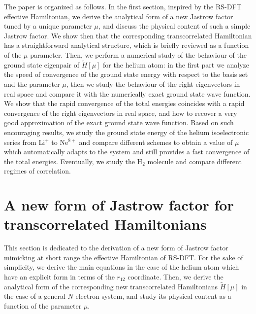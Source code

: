 \documentclass[aip,jcp,reprint,noshowkeys,superscriptaddress]{revtex4-1}
\begin{document}
The paper is organized as follows. 
In the first section, inspired by the RS-DFT effective Hamiltonian,  
we derive the analytical form of a new Jastrow factor tuned by a unique parameter $\mu$, and discuss the physical content of such a simple Jastrow factor. 
We show then that the corresponding transcorrelated Hamiltonian has a straightforward analytical structure, which is briefly reviewed as a function of the $\mu$ parameter. 
Then, we perform a numerical study of the behaviour of the ground state eigenpair of $\tilde{H}[\mu]$ for the helium atom: 
in the first part we analyze the speed of convergence of the ground state energy with respect to the basis set and the parameter $\mu$, 
then we study the behaviour of the right eigenvectors in real space and compare it with the numerically exact ground state wave function. 
We show that the rapid convergence of the total energies coincides with a rapid convergence of the right eigenvectors in real space, and how to recover a very good approximation of the exact ground state wave function. 
Based on such encouraging results, we study the ground state energy of the helium isoelectronic series from Li$^+$ to Ne$^{8+}$ and compare different schemes to obtain 
a value of $\mu$ which automatically adapts to the system and still provides a fast convergence of the total energies. 
Eventually, we study the H$_2$ molecule and compare different regimes of correlation. 

\section{A new form of Jastrow factor for transcorrelated Hamiltonians}
This section is dedicated to the derivation of a new form of Jastrow factor mimicking at short range the effective Hamiltonian of RS-DFT. 
For the sake of simplicity, we derive the main equations in the case of the helium atom which have an explicit form in terms of the $r_{12}$ coordinate. 
Then, we derive the analytical form of the corresponding new transcorrelated Hamiltonians $\tilde{H}[\mu]$ in the case of a general $N$-electron system, and study its physical content as a  function of the parameter $\mu$. 
\end{document}
